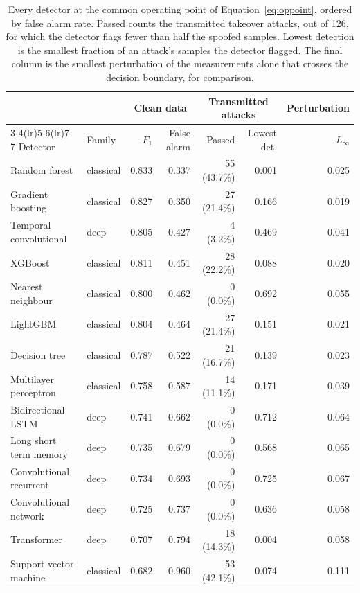 \begin{table}[t]
\centering
\caption{Every detector at the common operating point of Equation~\ref{eq:oppoint},
ordered by false alarm rate. Passed counts the transmitted takeover attacks, out of
126, for which the detector flags fewer than half the spoofed samples. Lowest detection
is the smallest fraction of an attack's samples the detector flagged. The final column
is the smallest perturbation of the measurements alone that crosses the decision
boundary, for comparison.}
\label{tab:main}
\footnotesize
\begin{tabular}{@{}llrrrrr@{}}
\toprule
 & & \multicolumn{2}{c}{Clean data} & \multicolumn{2}{c}{Transmitted attacks}
 & Perturbation \\
\cmidrule(lr){3-4}\cmidrule(lr){5-6}\cmidrule(lr){7-7}
Detector & Family & $F_1$ & False alarm & Passed & Lowest det.
 & $L_\infty$ \\
\midrule
Random forest & classical & 0.833 & 0.337 & 55 (43.7\%) & 0.001 & 0.025 \\
Gradient boosting & classical & 0.827 & 0.350 & 27 (21.4\%) & 0.166 & 0.019 \\
Temporal convolutional & deep & 0.805 & 0.427 & 4 (3.2\%) & 0.469 & 0.041 \\
XGBoost & classical & 0.811 & 0.451 & 28 (22.2\%) & 0.088 & 0.020 \\
Nearest neighbour & classical & 0.800 & 0.462 & 0 (0.0\%) & 0.692 & 0.055 \\
LightGBM & classical & 0.804 & 0.464 & 27 (21.4\%) & 0.151 & 0.021 \\
Decision tree & classical & 0.787 & 0.522 & 21 (16.7\%) & 0.139 & 0.023 \\
Multilayer perceptron & classical & 0.758 & 0.587 & 14 (11.1\%) & 0.171 & 0.039 \\
Bidirectional LSTM & deep & 0.741 & 0.662 & 0 (0.0\%) & 0.712 & 0.064 \\
Long short term memory & deep & 0.735 & 0.679 & 0 (0.0\%) & 0.568 & 0.065 \\
Convolutional recurrent & deep & 0.734 & 0.693 & 0 (0.0\%) & 0.725 & 0.067 \\
Convolutional network & deep & 0.725 & 0.737 & 0 (0.0\%) & 0.636 & 0.058 \\
Transformer & deep & 0.707 & 0.794 & 18 (14.3\%) & 0.004 & 0.058 \\
Support vector machine & classical & 0.682 & 0.960 & 53 (42.1\%) & 0.074 & 0.111 \\
\bottomrule
\end{tabular}
\end{table}

